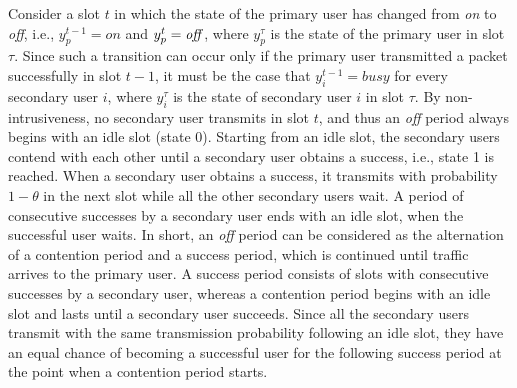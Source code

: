 \documentclass[12pt,draftclsnofoot,onecolumn]{IEEEtran}
\begin{document}
Consider a slot $t$ in which the state of the primary user has changed from \emph{on} to \emph{off},
i.e., $y_p^{t-1} = on$ and $y_p^t = \textrm{\emph{off}}$, where $y_p^{\tau}$ is the state of the primary
user in slot $\tau$.
Since such a transition can occur
only if the primary user transmitted a packet successfully in slot $t-1$, it must be the case that
$y_i^{t-1} = busy$ for every secondary user $i$,
where $y_i^{\tau}$ is the state of secondary user $i$ in slot $\tau$.
By non-intrusiveness, no secondary user transmits in slot $t$, and thus an \emph{off} period
always begins with an idle slot (state 0).
Starting from an idle slot, the secondary users contend with each other
until a secondary user obtains a success, i.e., state 1 is reached. When a secondary
user obtains a success, it transmits with probability $1-\theta$ in the next slot
while all the other secondary users wait. A period of consecutive successes by a secondary user
ends with an idle slot, when the successful user waits. In short, an \emph{off} period can be considered as
the alternation of a contention period and a success period, which is continued until
traffic arrives to the primary user. A success period consists of
slots with consecutive successes by a secondary user, whereas a contention period
begins with an idle slot and lasts until a secondary user succeeds. Since all the secondary users transmit
with the same transmission probability following an idle slot, they have an equal
chance of becoming a successful user for the following success period at the point when a contention period starts.
\end{document}
